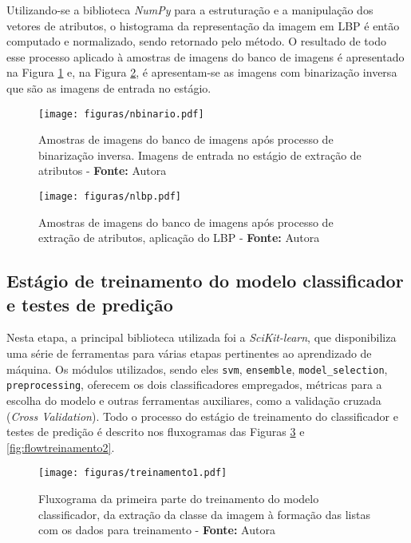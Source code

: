 Utilizando-se a biblioteca \textit{NumPy} para a estruturação e a manipulação dos vetores de atributos, o histograma da representação da imagem em LBP é então computado e normalizado, sendo retornado pelo método. O resultado de todo esse processo aplicado à amostras de imagens do banco de imagens é apresentado na Figura \ref{fig:nbinario} e, na Figura \ref{fig:nlbp}, é apresentam-se as imagens com binarização inversa que são as imagens de entrada no estágio.


\begin{figure}[H]
  \centering
  \texttt{[image: figuras/nbinario.pdf]}
  \caption{Amostras de imagens do banco de imagens após processo de binarização inversa. Imagens de entrada no estágio de extração de atributos  - \textbf{Fonte:} Autora}
  \label{fig:nbinario}
\end{figure}


\begin{figure}[H]
  \centering
  \texttt{[image: figuras/nlbp.pdf]}
  \caption{Amostras de imagens do banco de imagens após processo de extração de atributos, aplicação do LBP - \textbf{Fonte:} Autora}
  \label{fig:nlbp}
\end{figure}


\subsection{Estágio de treinamento do modelo classificador e testes de predição}

Nesta etapa, a principal biblioteca utilizada foi a \textit{SciKit-learn}, que disponibiliza uma série de ferramentas para várias etapas pertinentes ao aprendizado de máquina. Os módulos utilizados, sendo eles \texttt{svm}, \texttt{ensemble}, \texttt{model\_selection}, \texttt{preprocessing}, oferecem os dois classificadores empregados, métricas para a escolha do modelo e outras ferramentas auxiliares, como a validação cruzada (\textit{Cross Validation}). Todo o processo do estágio de treinamento do classificador e testes de predição é descrito nos fluxogramas das Figuras \ref{fig:flowtreinamento1} e \ref{fig:flowtreinamento2}.

\begin{figure}[H]
  \centering
  \texttt{[image: figuras/treinamento1.pdf]}
  \caption{Fluxograma da primeira parte do treinamento do modelo classificador, da extração da classe da imagem à formação das listas com os dados para treinamento - \textbf{Fonte:} Autora}
  \label{fig:flowtreinamento1}
\end{figure}

